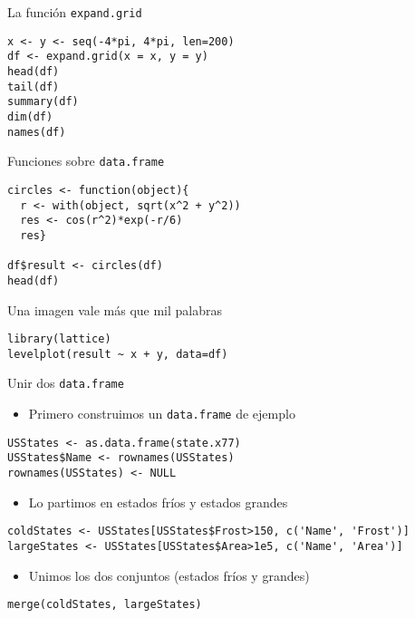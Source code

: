 \documentclass[xcolor={usenames,svgnames,dvipsnames}]{beamer}
\begin{document}
\begin{frame}[fragile,label=sec-4-2-4]{La función \texttt{expand.grid}}
 \lstset{language=R,numbers=none}
\begin{lstlisting}
x <- y <- seq(-4*pi, 4*pi, len=200)
df <- expand.grid(x = x, y = y)
head(df)
tail(df)
summary(df)
dim(df)
names(df)
\end{lstlisting}
\end{frame}
\begin{frame}[fragile,label=sec-4-2-5]{Funciones sobre \texttt{data.frame}}
 \lstset{language=R,numbers=none}
\begin{lstlisting}
circles <- function(object){
  r <- with(object, sqrt(x^2 + y^2))
  res <- cos(r^2)*exp(-r/6)
  res}

df$result <- circles(df)
head(df)
\end{lstlisting}
\end{frame}
\begin{frame}[fragile,label=sec-4-2-6]{Una imagen vale más que mil palabras}
 \lstset{language=R,numbers=none}
\begin{lstlisting}
library(lattice)
levelplot(result ~ x + y, data=df)
\end{lstlisting}
\end{frame}
\begin{frame}[fragile,label=sec-4-2-7]{Unir dos \texttt{data.frame}}
 \begin{itemize}
\item Primero construimos un \texttt{data.frame} de ejemplo
\end{itemize}
\lstset{language=R,numbers=none}
\begin{lstlisting}
USStates <- as.data.frame(state.x77)
USStates$Name <- rownames(USStates)
rownames(USStates) <- NULL
\end{lstlisting}
\begin{itemize}
\item Lo partimos en estados \guillemotleft{}fríos\guillemotright{} y estados \guillemotleft{}grandes\guillemotright{}
\end{itemize}
\lstset{language=R,numbers=none}
\begin{lstlisting}
coldStates <- USStates[USStates$Frost>150, c('Name', 'Frost')]
largeStates <- USStates[USStates$Area>1e5, c('Name', 'Area')]
\end{lstlisting}
\begin{itemize}
\item Unimos los dos conjuntos (estados \guillemotleft{}fríos\guillemotright{} y \guillemotleft{}grandes\guillemotright{})
\end{itemize}
\lstset{language=R,numbers=none}
\begin{lstlisting}
merge(coldStates, largeStates)
\end{lstlisting}
\end{frame}
\end{document}
